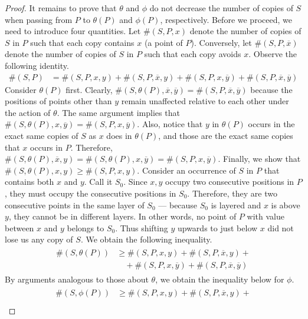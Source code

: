 \documentclass[12pt, a4paper, twoside]{report}
\begin{document}
\begin{proof}
It remains to prove that $\theta$ and $\phi$ do not decrease the number of copies of $S$ when passing from $P$ to $\theta(P)$ and $\phi(P)$, respectively. Before we proceed, we need to introduce four quantities. Let $\#(S,P,x)$ denote the number of copies of $S$ in $P$ such that each copy contains $x$ (a point of $P$). Conversely, let $\#(S,P,\overline{x})$ denote the number of copies of $S$ in $P$ such that each copy avoids $x$. Observe the following identity.
\begin{align}
  \#(S,P) &= \#(S,P,x,y) + \#(S,P,\overline{x},y) + \#(S,P,x,\overline{y}) + \#(S,P,\overline{x},\overline{y})
\end{align}
Consider $\theta(P)$ first. Clearly, $\#(S,\theta(P), \overline{x}, \overline{y}) = \#(S,P,\overline{x},\overline{y})$ because the positions of points other than $y$ remain unaffected relative to each other under the action of $\theta$. The same argument implies that $\#(S,\theta(P),x,\overline{y}) = \#(S,P,x,\overline{y})$. Also, notice that $y$ in $\theta(P)$ occurs in the exact same copies of $S$ as $x$ does in $\theta(P)$, and those are the exact same copies that $x$ occurs in $P$. Therefore, $\#(S,\theta(P),\overline{x},y) = \#(S,\theta(P),x, \overline{y}) = \#(S,P,x,\overline{y})$. Finally, we show that $\#(S,\theta(P), x, y) \geq  \#(S,P, x, y)$. Consider an occurrence of $S$ in $P$ that contains both $x$ and $y$. Call it $S_0$. Since $x,y$ occupy two consecutive positions in $P$, they must occupy the consecutive positions in $S_0$. Therefore, they are two consecutive points in the same layer of $S_0$ --- because $S_0$ is layered and $x$ is above $y$, they cannot be in different layers. In other words, no point of $P$ with value between $x$ and $y$ belongs to $S_0$. Thus shifting $y$ upwards to just below $x$ did not lose us any copy of $S$. We obtain the following inequality.
\begin{align}
  \begin{aligned}
  \#(S,\theta(P)) &\geq \#(S,P,x,y) + \#(S,P,\overline{x},y) +\\
                  &\quad+ \#(S,P,x,\overline{y}) + \#(S,P,\overline{x},\overline{y})
                \end{aligned}
\label{eq:theta_ineq}
\end{align}
By arguments analogous to those about $\theta$, we obtain the inequality below for $\phi$.
\begin{align}
  \begin{aligned}
  \#(S,\phi(P)) &\geq \#(S,P,x,y) + \#(S,P,\overline{x},y) + \\

\end{aligned}
\end{align}
\end{proof}
\end{document}
